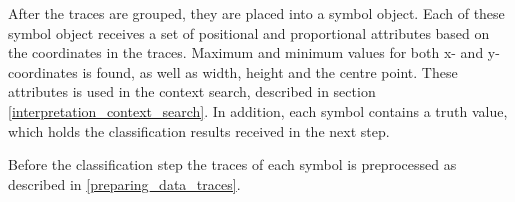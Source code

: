 After the traces are grouped, they are placed into a symbol object. Each of these symbol object receives a set of positional and proportional attributes based on the coordinates in the traces. Maximum and minimum values for both x- and y-coordinates is found, as well as width, height and the centre point. These attributes is used in the context search, described in section \ref{interpretation_context_search}. In addition, each symbol contains a truth value, which holds the classification results received in the next step.

Before the classification step the traces of each symbol is preprocessed as described in \ref{preparing_data_traces}. 



